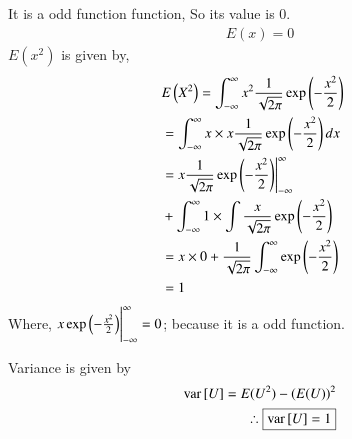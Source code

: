 \documentclass[journal,12pt,twocolumn]{IEEEtran}
\begin{document}
    It is a odd function function, So its value is 0.
    \begin{align}
        \boxed{E(x)=0}
    \end{align}
$E({x^2})$ is given by,
\begin{align}
		&	E\left(X^2\right) = \int_{-\infty}^{\infty}x^2\frac{1}{\sqrt{2\pi}}\exp{\left(-\frac{x^2}{2}\right)} \\
		& = \int_{-\infty}^{\infty} x \times x \frac{1}{\sqrt{2\pi}}\exp\left(-\frac{x^2}{2}\right) dx & \\
		& = x\frac{1}{\sqrt{2\pi}}\exp\left(-\frac{x^2}{2}\right)\Biggr|_{-\infty}^{\infty}& \\
 &+\int_{-\infty}^{\infty}1\times\int  \frac{x}{\sqrt{2\pi}}\exp\left(-\frac{x^2}{2}\right)&\\
 & = x \times 0+\frac{1}{\sqrt{2\pi}}\int_{-\infty}^{\infty} \exp\left(-\frac{x^2}{2}\right) & \\
		& =1\\
		\end{align}
Where, $x\exp\left(-\frac{x^2}{2}\right)\Biggr|_{-\infty}^{\infty} = 0$; because it is a odd function.

Variance is given by
    \begin{align}
        \text{var}{}\left[U\right]=E(U^2)-(E(U))^2\\
        \therefore \boxed{\text{var}{}\left[U\right]=1}
    \end{align}


\end{document}
